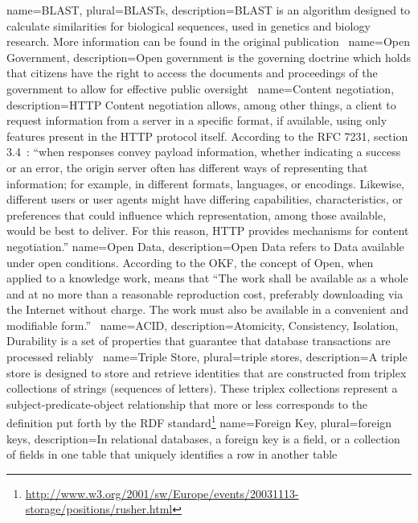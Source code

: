 {
  name=BLAST,
  plural=BLASTs,
  description={BLAST is an algorithm designed to calculate similarities for biological sequences, used in genetics and biology research. More information can be found in the original publication~\cite{Altschul1990}}
}
{
  name=Open Government,
  description={Open government is the governing doctrine which holds that citizens have the right to access the documents and proceedings of the government to allow for effective public oversight~\cite{Lathrop:2010:OGC:1840977}}
}
{
  name=Content negotiation,
  description={HTTP Content negotiation allows, among other things, a client to request information from a server in a specific format, if available, using only features present in the HTTP protocol itself. According to the RFC 7231, section 3.4~\cite{Fieldinget.al.}: ``when responses convey payload information, whether indicating a success or an error, the origin server often has different ways of representing that information; for example, in different formats, languages, or encodings. Likewise, different users or user agents might have differing capabilities, characteristics, or preferences that could influence which representation, among those available, would be best to deliver.  For this reason, HTTP provides mechanisms for content negotiation.''}
}
{
  name=Open Data,
  description={Open Data refers to Data available under open conditions. According to the \gls{OKF}, the concept of Open, when applied to a knowledge work, means that ``The work shall be available as a whole and at no more than a reasonable reproduction cost, preferably downloading via the Internet without charge. The work must also be available in a convenient and modifiable form.''~\cite{10.1371/journal.pbio.1001195}}
}
{
  name=ACID,
  description={Atomicity, Consistency, Isolation, Durability is a set of properties that guarantee that database transactions are processed reliably~\cite{Haerder:1983:PTD:289.291}}
}
{
  name=Triple Store,
  plural=triple stores,
  description={A triple store is designed to store and retrieve identities that are constructed from triplex collections of strings (sequences of letters). These triplex collections represent a subject-predicate-object relationship that more or less corresponds to the definition put forth by the RDF standard\footnote{\url{http://www.w3.org/2001/sw/Europe/events/20031113-storage/positions/rusher.html}}
  }
}
{
  name=Foreign Key,
  plural=foreign keys,
  description={In relational databases, a foreign key is a field, or a collection of fields in one table that uniquely identifies a row in another table~\cite{Coronel2009}
  }
}

